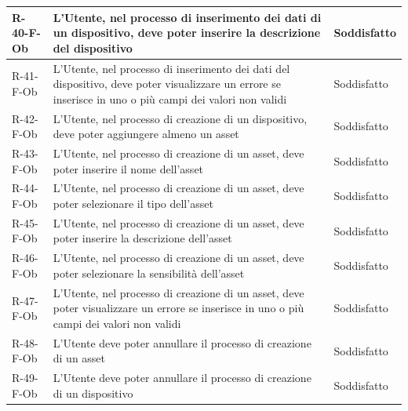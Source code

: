 \documentclass[a4paper,12pt]{article}
\begin{document}
{{\begin{longtable}{|l|p{}|p{}|}
                R-40-F-Ob       & L'Utente, nel processo di inserimento dei dati di un dispositivo, deve poter inserire la descrizione del dispositivo                                                                        & Soddisfatto \\ \hline
                R-41-F-Ob       & L'Utente, nel processo di inserimento dei dati del dispositivo, deve poter visualizzare un errore se inserisce in uno o più campi dei valori non validi                                     & Soddisfatto \\ \hline
                R-42-F-Ob       & L'Utente, nel processo di creazione di un dispositivo, deve poter aggiungere almeno un asset                                                                                                & Soddisfatto \\ \hline
                R-43-F-Ob       & L'Utente, nel processo di creazione di un asset, deve poter inserire il nome dell'asset                                                                                                     & Soddisfatto \\ \hline
                R-44-F-Ob       & L'Utente, nel processo di creazione di un asset, deve poter selezionare il tipo dell'asset                                                                                                  & Soddisfatto \\ \hline
                R-45-F-Ob       & L'Utente, nel processo di creazione di un asset, deve poter inserire la descrizione dell'asset                                                                                              & Soddisfatto \\ \hline
                R-46-F-Ob       & L'Utente, nel processo di creazione di un asset, deve poter selezionare la sensibilità dell'asset                                                                                           & Soddisfatto \\ \hline
                R-47-F-Ob       & L'Utente, nel processo di creazione di un asset, deve poter visualizzare un errore se inserisce in uno o più campi dei valori non validi                                                    & Soddisfatto \\ \hline
                R-48-F-Ob       & L'Utente deve poter annullare il processo di creazione di un asset                                                                                                                          & Soddisfatto \\ \hline
                R-49-F-Ob       & L'Utente deve poter annullare il processo di creazione di un dispositivo                                                                                                                    & Soddisfatto \\ \hline

\end{longtable}}}
\end{document}
